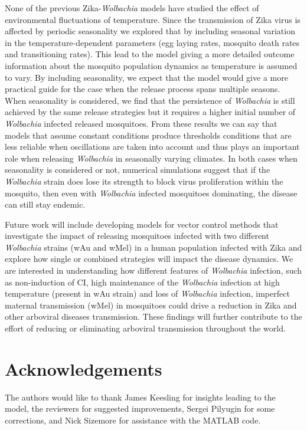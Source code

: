 \documentclass{ws-rv9x6}
\begin{document}
None of the previous Zika-\textit{Wolbachia} models have studied the effect of environmental fluctuations of temperature.  Since the transmission of Zika virus is affected by periodic seasonality we explored that by including seasonal variation in the temperature-dependent parameters (egg laying rates, mosquito death rates and transitioning rates). This lead to the model giving a more detailed outcome information about the mosquito population dynamics as temperature is assumed to vary. By including seasonality, we expect that the model would give a more practical guide for the case when the release process spans multiple seasons. When seasonality is considered, we find that the persistence of \textit{Wolbachia} is still achieved by the same release strategies but it requires a higher initial number of \textit{Wolbachia} infected released mosquitoes. From these results we can say that models that assume constant conditions produce thresholds conditions that are less reliable when oscillations are taken into account and thus plays an important role when releasing \textit{Wolbachia} in seasonally varying climates. In both cases when seasonality is considered or not, numerical simulations suggest that if the \textit{Wolbachia} strain does lose its strength to block virus proliferation within the mosquito, then even with \textit{Wolbachia} infected mosquitoes dominating, the disease can still stay endemic. 

Future work will include developing models for vector control methods that investigate the impact of releasing mosquitoes infected with two different \textit{Wolbachia} strains (wAu and wMel) in a human population infected with Zika and explore how single or combined strategies will impact the disease dynamics. We are interested in understanding how different features of \textit{Wolbachia}  infection, such as non-induction of CI, high maintenance of the \textit{Wolbachia} infection at high temperature (present in wAu strain) and loss of \textit{Wolbachia} infection, imperfect maternal transmission (wMel) in mosquitoes could drive a reduction in Zika and other arboviral diseases transmission. These findings will further contribute to the effort of reducing or eliminating arboviral transmission throughout the world.
\section{Acknowledgements}
The authors would like to thank James Keesling for insights leading to the model, the reviewers for suggested improvements, Sergei Pilyugin for some corrections, and Nick Sizemore for assistance with the MATLAB code.



\end{document}
